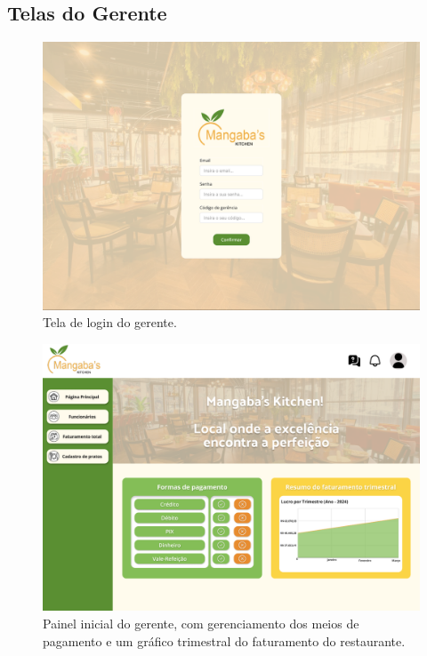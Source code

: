 \listoffigures
\newpage

\begin{center}
    \subsection{Telas do Gerente}
    \begin{figure}[!htp]
        \includegraphics[width=1\textwidth]{imagens-template/Layout_Gerente_2638.png} 
        \caption{Tela de login do gerente.}
    \end{figure}
    \newpage
    \begin{figure}[!htp]
        \includegraphics[width=1\textwidth]{imagens-template/Layout_Gerente_2700.png} 
        \caption{Painel inicial do gerente, com gerenciamento dos meios de pagamento e um gráfico trimestral do faturamento do restaurante.}

\end{figure}
\end{center}
